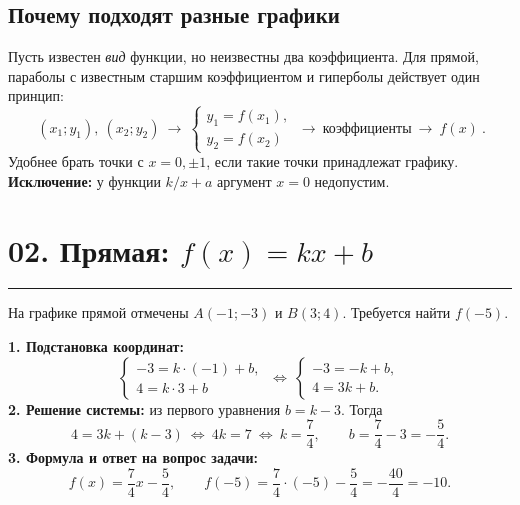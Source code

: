 \documentclass[a4paper,12pt]{article}
\newcommand{\sectionline}{\par\vspace{-4pt}\noindent\textcolor{accent}{\rule{\linewidth}{0.55pt}}\par\vspace{3pt}}
\begin{document}
\subsection*{Почему подходят разные графики}
Пусть известен \emph{вид} функции, но неизвестны два коэффициента. Для прямой, параболы с известным старшим коэффициентом и гиперболы действует один принцип:
\[
\boxed{\ (x_1;y_1),\ (x_2;y_2)\ \longrightarrow\
\begin{cases}y_1=f(x_1),\\y_2=f(x_2)\end{cases}
\ \longrightarrow\ \text{коэффициенты}\ \longrightarrow\ f(x)\ }.
\]
Удобнее брать точки с \(x=0,\pm1\), если такие точки принадлежат графику. \textbf{Исключение:} у функции \(k/x+a\) аргумент \(x=0\) недопустим.

\section*{02. Прямая: \(f(x)=kx+b\)}
\sectionline
На графике прямой отмечены \(A(-1;-3)\) и \(B(3;4)\). Требуется найти \(f(-5)\).
\begin{center}
\end{center}
\textbf{1. Подстановка координат:}
\[
\begin{cases}
-3=k\cdot(-1)+b,\\
4=k\cdot3+b
\end{cases}
\ \Longleftrightarrow\
\begin{cases}-3=-k+b,\\4=3k+b.\end{cases}
\]
\textbf{2. Решение системы:} из первого уравнения \(b=k-3\). Тогда
\[
4=3k+(k-3)\ \Longleftrightarrow\ 4k=7\ \Longleftrightarrow\ k=\frac74,
\qquad b=\frac74-3=-\frac54.
\]
\textbf{3. Формула и ответ на вопрос задачи:}
\[
f(x)=\frac74x-\frac54,\qquad
f(-5)=\frac74\cdot(-5)-\frac54=-\frac{40}{4}=\boxed{-10}.
\]
\clearpage
\end{document}
